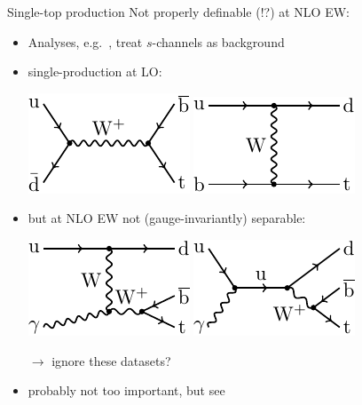 \begin{frame}{Single-top production}
Not properly definable (!?) at NLO EW:
\begin{itemize}
\item Analyses, e.g.\ , treat $s$-channels as background
\item single-production at LO:
\begin{center}
\includegraphics{ew_corrections/figures/fd10_born_s_channel_top}\hspace{0.4cm}
\includegraphics{ew_corrections/figures/fd11_born_t_channel_top}
\end{center}
\item but at NLO EW not (gauge-invariantly) separable:
\begin{center}
\includegraphics{ew_corrections/figures/fd12_real_ts_channel_top}\hspace{0.4cm}
\includegraphics{ew_corrections/figures/fd13_real_s_channel_top}
\end{center}
\item[$\rightarrow$] ignore these datasets?
\item probably not too important, but see 
\end{itemize}
\end{frame}

